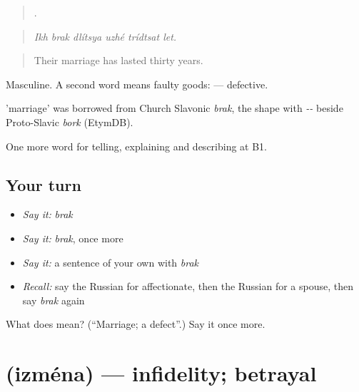 \begin{quote}
     .
\end{quote}

\begin{quote}
\emph{Ikh brak dlítsya uzhé trídtsat let.}
\end{quote}

\begin{quote}
Their marriage has lasted thirty years.
\end{quote}

Masculine. A second word \emph{} means faulty goods: \emph{} — defective.

\begin{cousinweb}
\emph{} 'marriage' was borrowed from Church Slavonic \emph{brak}, the shape with \emph{--} beside Proto-Slavic \emph{bork} (EtymDB).
\end{cousinweb}

\begin{grammarlens}[title={What you've built}]
One more word for telling, explaining and describing at B1.
\end{grammarlens}

\subsection*{Your turn}
\begin{itemize}
\raggedright
  \item \emph{Say it:} \emph{brak}
  \item \emph{Say it:} \emph{brak}, once more
  \item \emph{Say it:} a sentence of your own with \emph{brak}
  \item \emph{Recall:} say the Russian for affectionate, then the Russian for a spouse, then say \emph{brak} again
\end{itemize}

\begin{tcolorbox}[breakable,colback=teal!4,colframe=teal!35!black,title={Before you move on}]
What does  mean? (\textquotedblleft{}Marriage; a defect\textquotedblright{}.) Say it once more.
\end{tcolorbox}
\section[\texorpdfstring{\ru{измена} (izména)}{измена (izména)}]{ (izména) — infidelity; betrayal}

